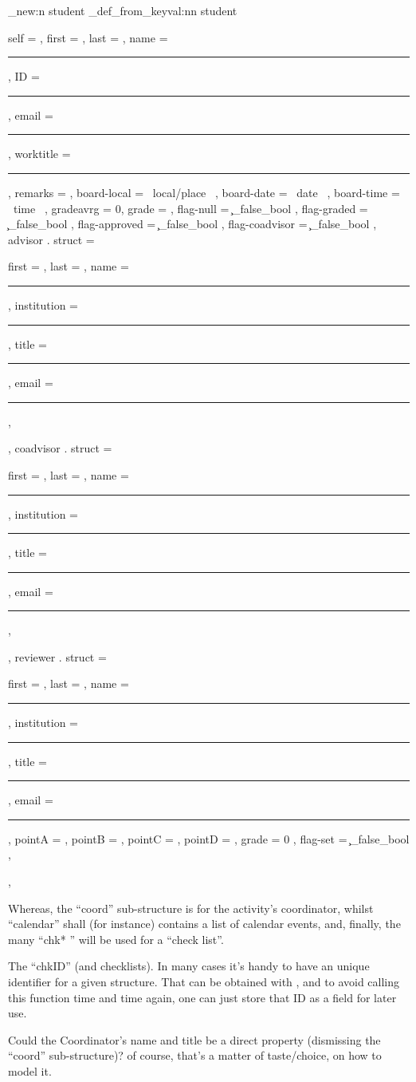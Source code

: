 \documentclass[10pt]{article}
\begin{document}
\begin{codestore}
\starray_new:n {student}
\starray_def_from_keyval:nn {student} {
  self = , %
  first = ,
  last = ,
  name = \rule{\l__stdemo_name_rule_dim}{.1pt} ,
  ID    = \rule{\l__stdemo_ID_rule_dim}{.1pt} , 
  email = \rule{\l__stdemo_email_rule_dim}{.1pt} ,
  worktitle = \rule{\l__stdemo_worktitle_rule_dim}{.1pt} ,
  remarks = ,
  board-local = {~local/place~} ,
  board-date   = {~date~} ,
  board-time  = {~time~} ,
  gradeavrg = 0,
  grade = ,
  flag-null = \c_false_bool , %
  flag-graded = \c_false_bool , %
  flag-approved = \c_false_bool ,
  flag-coadvisor = \c_false_bool ,
  advisor . struct = {
    first = ,
    last =  ,
    name = \rule{\l__stdemo_name_rule_dim}{.1pt},
    institution = \rule{\l__stdemo_name_rule_dim}{.1pt},
    title = \rule{\l__stdemo_title_rule_dim}{.1pt} ,
    email = \rule{\l__stdemo_email_rule_dim}{.1pt} ,
  } ,
  coadvisor . struct = {
    first = ,
    last =  ,
    name = \rule{\l__stdemo_name_rule_dim}{.1pt},
    institution = \rule{\l__stdemo_name_rule_dim}{.1pt},
    title = \rule{\l__stdemo_title_rule_dim}{.1pt} ,
    email = \rule{\l__stdemo_email_rule_dim}{.1pt} ,
  } ,
  reviewer . struct = {
    first = ,
    last =  ,
    name = \rule{\l__stdemo_name_rule_dim}{.1pt},
    institution = \rule{\l__stdemo_name_rule_dim}{.1pt},
    title = \rule{\l__stdemo_title_rule_dim}{.1pt} ,
    email = \rule{\l__stdemo_email_rule_dim}{.1pt} ,
    pointA = ,
    pointB = ,
    pointC = ,
    pointD = ,
    grade = 0 ,
    flag-set = \c_false_bool , 
  } ,
 }
\end{codestore}







Whereas, the ``coord'' sub-structure is for the activity's coordinator, whilst ``calendar'' shall (for instance) contains a list of calendar events, and, finally, the many ``chk* '' will be used for a ``check list''.

\begin{tsremark}
The ``chkID'' (and checklists). In many cases it's handy to have an unique identifier for a given structure. That can be obtained with , and to avoid calling this function time and time again, one can just store that ID as a field for later use.
\end{tsremark}
\begin{tsremark}
  Could the Coordinator's name and title be a direct property (dismissing the ``coord'' sub-structure)? of course, that's a matter of taste/choice, on how to model it.
\end{tsremark}
\end{document}
